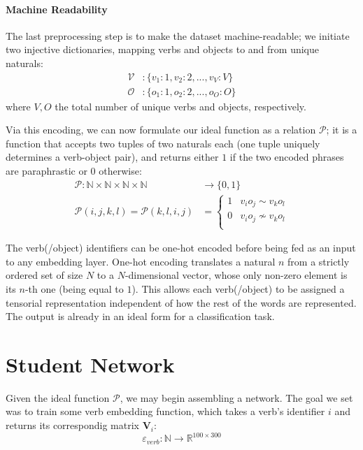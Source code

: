 \documentclass[a4paper,11pt]{article}
\begin{document}
\paragraph{Machine Readability}
The last preprocessing step is to make the dataset machine-readable; we initiate two injective dictionaries, mapping verbs and objects to and from unique naturals:
\begin{align*}
	\mathcal{V}&: \{v_1: 1, v_2: 2, ..., v_V: V\}\\
	\mathcal{O}&: \{o_1: 1, o_2: 2, ..., o_O: O\}
\end{align*}
where $V, O$ the total number of unique verbs and objects, respectively. 

Via this encoding, we can now formulate our ideal function as a relation $\mathcal{P}$; it is a function that accepts two tuples of two naturals each (one tuple uniquely determines a verb-object pair), and returns either $1$ if the two encoded phrases are paraphrastic or $0$ otherwise:
\begin{align*}
\mathcal{P}: \mathbb{N} \times \mathbb{N} \times \mathbb{N} \times \mathbb{N} &\to \{0, 1\}\\
	\mathcal{P}(i,j,k,l) = \mathcal{P}(k,l,i,j)
	 &= \begin{cases}
	1 & v_i o_j \sim v_k o_l\\
	0 & v_i o_j \nsim v_k o_l\\
	\end{cases}
\end{align*}

The verb(/object) identifiers can be one-hot encoded before being fed as an input to any embedding layer. One-hot encoding translates a natural $n$ from a strictly ordered set of size $N$ to a $N$-dimensional vector, whose only non-zero element is its $n$-th one (being equal to $1$). This allows each verb(/object) to be assigned a tensorial representation independent of how the rest of the words are represented. The output is already in an ideal form for a classification task.

\section{Student Network}
Given the ideal function $\mathcal{P}$, we may begin assembling a network. The goal we set was to train some verb embedding function, which takes a verb's identifier $i$ and returns its correspondig matrix $\mathbf{V}_i$:
 \[\varepsilon_{verb}: \mathbb{N} \to \mathbb{R}^{100 \times 300}\]
\end{document}
